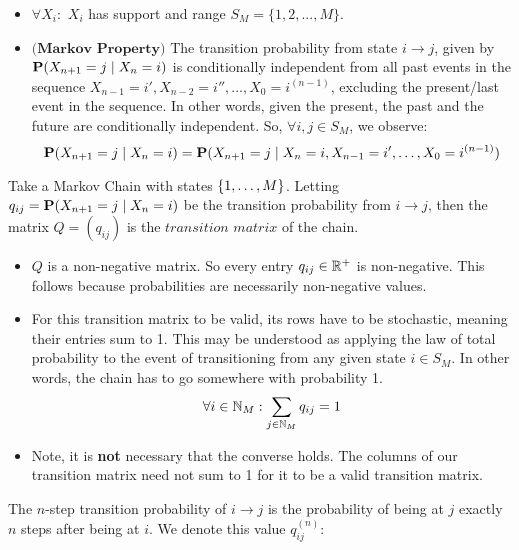 \begin{itemize}
\item $\forall X_i:$ $X_i$ has support and range $S_M = \{1,2,...,M\}$.
\item $\textbf{(Markov Property)}$ The transition probability from state $i \to j$, given by $\Prb(X_{n+1} = j \mid X_n = i)$ is conditionally independent from all past events in the sequence $X_{n-1} = i',X_{n-2} = i'', \dots,X_0 = i^{(n-1)}$, excluding the present/last event in the sequence. In other words, given the present, the past and the future are conditionally independent. So, $\forall i,j \in S_M$, we observe:
$$ \Prb(X_{n+1} = j \mid X_n = i) = \Prb(X_{n+1} = j \mid X_n = i, X_{n-1} = i', \dots,X_0 = i^{(n-1)})$$
\end{itemize}

\newpage
{}

\begin{definition}
Take a Markov Chain with states $\{\oneto[M]\}$. Letting $q_{ij} = \P(X_{n+1} = j \mid X_n = i)$ be the transition probability from $i \to j$, then the matrix $Q=(q_{ij})$ is the $\textit{transition matrix}$ of the chain.
\end{definition}

\begin{itemize}
\item $Q$ is a non-negative matrix. So every entry $q_{ij} \in \R^+$ is non-negative. This follows because probabilities are necessarily non-negative values.
\item For this transition matrix to be valid, its rows have to be stochastic, meaning their entries sum to 1. This may be understood as applying the law of total probability to the event of transitioning from any given state $i \in S_M$. In other words, the chain has to go somewhere with probability 1.
$$\forall i \in \N_M: \sum_{j \in \N_M} q_{ij} = 1$$
\item Note, it is \textbf{not} necessary that the converse holds. The columns of our transition matrix need not sum to 1 for it to be a valid transition matrix.
\end{itemize}

\begin{definition} The $n$-step transition probability of $i \to j$ is the probability of being at $j$ exactly $n$ steps after being at $i$. We denote this value $q_{ij}^{(n)}:$
\end{definition}

